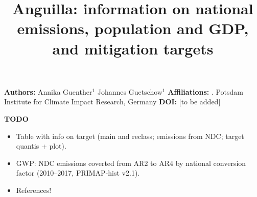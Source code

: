\documentclass[12pt]{article}
\title{ \bfseries \color{PIKorange} Anguilla: information on national emissions, population and GDP, and mitigation targets}
\begin{document}
 \maketitle

 \noindent \textbf{Authors:} \newline
 \indent Annika Guenther$^{1}$ \newline
 \indent Johannes Guetschow$^{1}$ \newline
 \noindent \textbf{Affiliations:} \newline
 . Potsdam Institute for Climate Impact Research, Germany \newline
 \noindent \textbf{DOI:} [to be added] \newline

 \textbf{TODO}
 \begin{itemize}
 \item Table with info on target (main and reclass; emissions from NDC; target quantis + plot).
 \item GWP: NDC emissions coverted from AR2 to AR4 by national conversion factor (2010--2017, PRIMAP-hist v2.1).
 \item References!
 \end{itemize}

\end{document}

